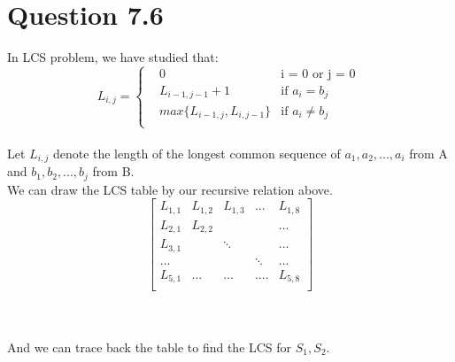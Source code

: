\documentclass{article}
\begin{document}
\section{Question 7.6}
In LCS problem, we have studied that:
$$
L_{i,j} = \left\{
\begin{aligned}
&0  &\text{i = 0 or j = 0}\\
&L_{i-1,j-1} + 1  &\text{if $a_i = b_j $}\\
&max\{L_{i-1,j}, L_{i, j-1}\}  &\text{if $a_i \neq b_j$}\\
\end{aligned}
\right.\
$$
\\
Let $L_{i,j}$ denote the length of the longest common sequence of $a_1, a_2, ..., a_i$ from A and $b_1, b_2, ... , b_j$ from B.\\
We can draw the LCS table by our recursive relation above.\\
\[
\begin{bmatrix}

	L_{1,1} &	L_{1,2} & L_{1,3} & ... & L_{1,8} \\
	L_{2,1} &	L_{2,2} & 		&	& ...\\
	L_{3,1} &  			& 	\ddots	&  & ...\\
		... &  			& 		&\ddots &  ...\\
	L_{5,1} & ...		& ...	 & .... & L_{5,8}\\
\end{bmatrix}
\]
\\
\\
And we can trace back the table to find the LCS for $S_1, S_2$.\\
\end{document}
